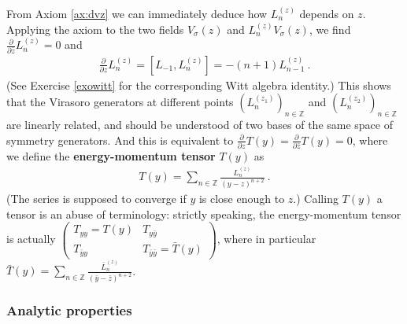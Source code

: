 \documentclass[12pt, a4paper, notitlepage, twoside]{report}
\numberwithin{equation}{section}
\theoremstyle{break}
\begin{document}
From Axiom \ref{ax:dvz} we can immediately deduce how $L_n^{(z)}$ depends on $z$. Applying the axiom to the two fields $V_\sigma(z)$ and $L_n^{(z)}V_\sigma(z)$, we find $\frac{\partial}{\partial \bar z} L_n^{(z)}=0$ and 
\begin{align}
 \frac{\partial}{\partial z} L_n^{(z)} = [L_{-1},L_n^{(z)}] = -(n+1)L_{n-1}^{(z)}\ .
 \label{pll}
\end{align}
(See Exercise \ref{exowitt} for the corresponding Witt algebra identity.)
This shows that the Virasoro generators at different points $(L_n^{(z_1)})_{n\in \mathbb{Z}}$ and $(L_n^{(z_2)})_{n\in \mathbb{Z}}$ are linearly related, and should be understood of two bases of the same space of symmetry generators.
And this is equivalent to $\frac{\partial}{\partial z} T(y) = \frac{\partial}{\partial \bar z} T(y) = 0$, where we define the \textbf{\boldmath energy-momentum tensor} $T(y)$ as 
\begin{align}
 \boxed{T(y) = \sum_{n\in{\mathbb{Z}}} \frac{L_n^{(z)}}{(y-z)^{n+2}}}\ .
\label{tsl}
\end{align}
(The series is supposed to converge if $y$ is close enough to $z$.) Calling $T(y)$ a tensor is an abuse of terminology: strictly speaking, the energy-momentum tensor is actually 
$\left(\begin{smallmatrix} T_{yy} = T(y) & T_{y\bar y} \\ T_{\bar y y} & T_{\bar y \bar y} = \bar T(y) \end{smallmatrix}\right)$, where in particular $\bar T(y)= \sum_{n\in{\mathbb{Z}}} \frac{\bar L_n^{(z)}}{(\bar y-\bar z)^{n+2}}$. 

\subsubsection{Analytic properties}
\end{document}
